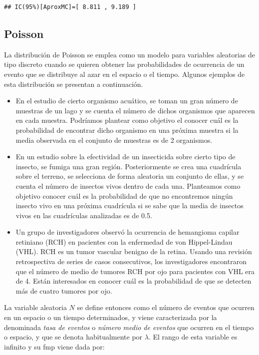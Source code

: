 \documentclass[
]{book}
\theoremstyle{definition}
\theoremstyle{definition}
\theoremstyle{definition}
\theoremstyle{definition}
\theoremstyle{remark}
\begin{document}
\begin{verbatim}
## IC(95%)[AproxMC]=[ 8.811 , 9.189 ]
\end{verbatim}

\hypertarget{poisson}{%
\subsection{Poisson}\label{poisson}}

La distribución de Poisson se emplea como un modelo para variables aleatorias de tipo discreto cuando se quieren obtener las probabilidades de ocurrencia de un evento que se distribuye al azar en el espacio o el tiempo. Algunos ejemplos de esta distribución se presentan a continuación.

\begin{itemize}
\item
  En el estudio de cierto organismo acuático, se toman un gran número de muestras de un lago y se cuenta el número de dichos organismos que aparecen en cada muestra. Podríamos plantear como objetivo el conocer cuál es la probabilidad de encontrar dicho organismo en una próxima muestra si la media observada en el conjunto de muestras es de 2 organismos.
\item
  En un estudio sobre la efectividad de un insecticida sobre cierto tipo de insecto, se fumiga una gran región. Posteriormente se crea una cuadrícula sobre el terreno, se selecciona de forma aleatoria un conjunto de ellas, y se cuenta el número de insectos vivos dentro de cada una. Planteamos como objetivo conocer cuál es la probabilidad de que no encontremos ningún insecto vivo en una próxima cuadrícula si se sabe que la media de insectos vivos en las cuadrículas analizadas es de 0.5.
\item
  Un grupo de investigadores observó la ocurrencia de hemangioma capilar retiniano (RCH) en pacientes con la enfermedad de von Hippel-Lindau (VHL). RCH es un tumor vascular benigno de la retina. Usando una revisión retrospectiva de series de casos consecutivos, los investigadores encontraron que el número de medio de tumores RCH por ojo para pacientes con VHL era de 4. Están interesados en conocer cuál es la probabilidad de que se detecten más de cuatro tumores por ojo.
\end{itemize}

La variable aleatoria \(N\) se define entonces como el número de eventos que ocurren en un espacio o un tiempo determinados, y viene caracterizada por la denominada \emph{tasa de eventos} o \emph{número medio de eventos} que ocurren en el tiempo o espacio, y que se denota habitualmente por \(\lambda\). El rango de esta variable es infinito y su fmp viene dada por:
\end{document}
